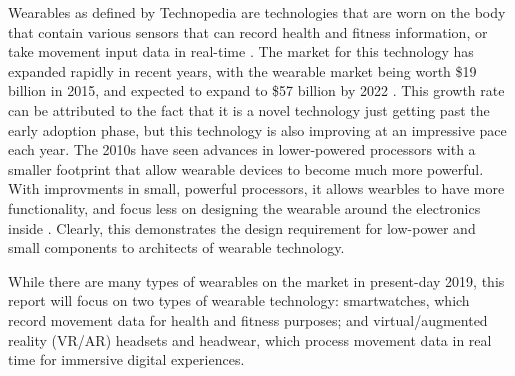 Wearables as defined by Technopedia are technologies that are worn on
the body that contain various sensors that can record health and fitness
information, or take movement input data in real-time \cite{technopedia_defn}.
The market for this technology has expanded rapidly in recent years, with the
wearable market being worth \$19 billion in 2015, and expected to expand to \$57 billion
by 2022 \cite{market_growth}. This growth rate can be attributed to the fact that it is a novel
technology just getting past the early adoption phase, but this technology is also improving
at an impressive pace each year. The 2010s have seen advances in lower-powered processors with 
a smaller footprint that allow wearable devices to become much more powerful. With improvments in
small, powerful processors, it allows wearbles to have more functionality, and focus less on
designing the wearable around the electronics inside \cite{wearable_rev}. Clearly, this demonstrates
the design requirement for low-power and small components to architects of wearable technology.

While there are many types of wearables on the market in present-day 2019, this report will
focus on two types of wearable technology: smartwatches, which record movement data
for health and fitness purposes; and virtual/augmented reality (VR/AR) headsets
and headwear, which process movement data in real time for immersive digital experiences.